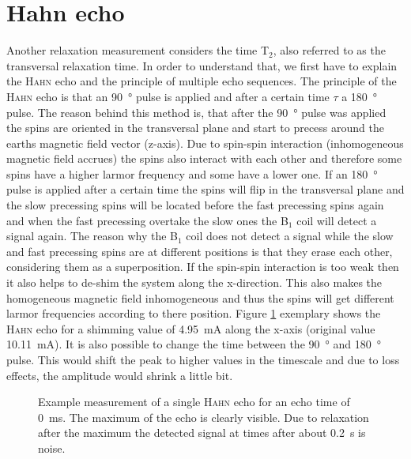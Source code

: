 \section{Hahn echo}
\label{sec:Hahnecho}
Another relaxation measurement considers the time T$_2$, also referred to as the transversal relaxation time.
In order to understand that, we first have to explain the \textsc{Hahn} echo and the principle of multiple echo sequences.\newline
The principle of the \textsc{Hahn} echo is that an \SI{90}{\degree} pulse is applied and after a certain time $\tau$ a \SI{180}{\degree} pulse.
The reason behind this method is, that after the \SI{90}{\degree} pulse was applied the spins are oriented in the transversal plane and start to precess around the earths magnetic field vector (z-axis).
Due to spin-spin interaction (inhomogeneous magnetic field accrues) the spins also interact with each other and therefore some spins have a higher larmor frequency and some have a lower one.
If an \SI{180}{\degree} pulse is applied after a certain time the spins will flip in the transversal plane and the slow precessing spins will be located before the fast precessing spins again and when the fast precessing  overtake the slow ones the B$_1$ coil will detect a signal again.
The reason why the B$_1$ coil does not detect a signal while the slow and fast precessing spins are at different positions is that they erase each other, considering them as a superposition.
If the spin-spin interaction is too weak then it also helps to de-shim the system along the x-direction.
This also makes the homogeneous magnetic field inhomogeneous and thus the spins will get different larmor frequencies according to there position.\newline
Figure \ref{fig:Echobeispeilsignal} exemplary shows the \textsc{Hahn} echo for a shimming value of \SI{4.95}{\milli \ampere} along the x-axis (original value \SI{10.11}{\milli \ampere}).
It is also possible to change the time between the \SI{90}{\degree} and \SI{180}{\degree} pulse.
This would shift the peak to higher values in the timescale and due to loss effects, the amplitude would shrink a little bit.
\begin{figure}[H]
    \centering
    
    \caption[Example measurement of a single \textsc{Hahn} echo for an echo time of \SI{0}{\milli \second}.]{Example measurement of a single \textsc{Hahn} echo for an echo time of \SI{0}{\milli \second}.
    The maximum of the echo is clearly visible.
    Due to relaxation after the maximum the detected signal at times after about \SI{0.2}{\second} is noise.}
    \label{fig:Echobeispeilsignal}
\end{figure}
